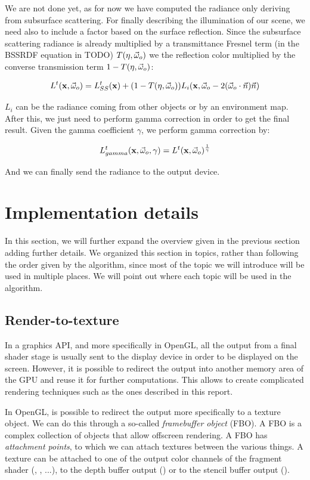 We are not done yet, as for now we have computed the radiance only deriving from subsurface scattering. For finally describing the illumination of our scene, we need also to include a factor based on the surface reflection. Since the subsurface scattering radiance is already multiplied by a transmittance Fresnel term (in the BSSRDF equation in TODO) $T(\eta,\vec{\omega}_o)$ we the reflection color multiplied by the converse transmission term $1 - T(\eta,\vec{\omega}_o)$:

$$
L^t(\mathbf{x}, \vec{\omega}_o) = L_{SS}^t(\mathbf{x}) + (1 - T(\eta,\vec{\omega}_o)) L_i(\mathbf{x}, \vec{\omega}_o - 2 (\vec{\omega}_o \cdot \vec{n}) \vec{n})
$$

$L_i$ can be the radiance coming from other objects or by an environment map. After this, we just need to perform gamma correction in order to get the final result. Given the gamma coefficient $\gamma$, we perform gamma correction by:

$$
L_{gamma}^t(\mathbf{x}, \vec{\omega}_o, \gamma) = L^t(\mathbf{x},\vec{\omega}_o)^{\frac{1}{\gamma}}
$$

And we can finally send the radiance to the output device.

\section{Implementation details}
In this section, we will further expand the overview  given in the previous section adding further details. We organized this section in topics, rather than following the order given by the algorithm, since most of the topic we will introduce will be used in multiple places. We will point out where each topic will be used in the algorithm.

\subsection{Render-to-texture}
In a graphics API, and more specifically in OpenGL, all the output from a final shader stage is usually sent to the display device in order to be displayed on the screen. However, it is possible to redirect the output into another memory area of the GPU and reuse it for further computations. This allows to create complicated rendering techniques such as the ones described in this report. 

In OpenGL, is possible to redirect the output more specifically to a texture object. We can do this through a so-called \emph{framebuffer object} (FBO). A FBO is a complex collection of objects that allow offscreen rendering. A FBO has \emph{attachment points}, to which we can attach textures between the various things. A texture can be attached to one of the output color channels of the fragment shader (, , ...), to the depth buffer output () or to the stencil buffer output ().

